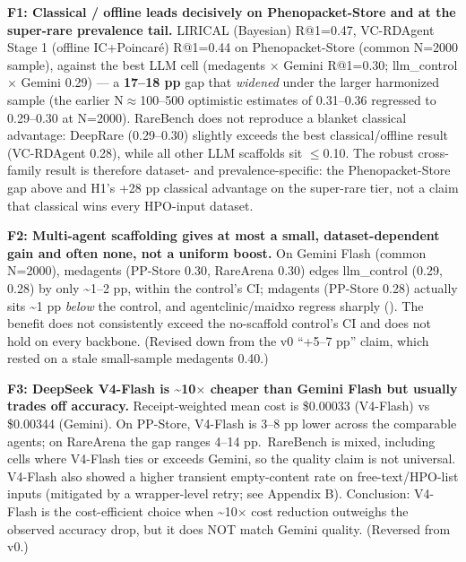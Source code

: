 \textbf{F1: Classical / offline leads decisively on Phenopacket-Store and at the super-rare prevalence tail.}
LIRICAL (Bayesian) R@1=0.47, VC-RDAgent Stage 1 (offline IC+Poincar\'e)
R@1=0.44 on Phenopacket-Store (common N=2000 sample), against the best LLM
cell (medagents \ensuremath{\times} Gemini R@1=0.30; llm\_control \ensuremath{\times} Gemini 0.29) --- a
\textbf{17--18 pp} gap that \emph{widened} under the larger harmonized sample (the earlier
N\ensuremath{\approx}100--500 optimistic estimates of 0.31--0.36 regressed to 0.29--0.30 at N=2000).
RareBench does not reproduce a blanket classical advantage: DeepRare
(0.29--0.30) slightly exceeds the best classical/offline result
(VC-RDAgent 0.28), while all other LLM scaffolds sit \ensuremath{\leq}0.10. The robust
cross-family result is therefore dataset- and prevalence-specific: the
Phenopacket-Store gap above and H1's +28 pp classical advantage on the
super-rare tier, not a claim that classical wins every HPO-input dataset.

\textbf{F2: Multi-agent scaffolding gives at most a small, dataset-dependent gain and often none, not a uniform boost.} On Gemini Flash (common N=2000), medagents
(PP-Store 0.30, RareArena 0.30) edges llm\_control (0.29, 0.28) by only \textasciitilde1--2 pp,
within the control's CI; mdagents (PP-Store 0.28) actually sits \textasciitilde1 pp \emph{below} the
control, and agentclinic/maidxo regress sharply (). The benefit does not
consistently exceed the no-scaffold control's CI and does not hold on every
backbone. (Revised down from the v0 ``+5--7 pp'' claim, which rested on a stale small-sample medagents 0.40.)

\textbf{F3: DeepSeek V4-Flash is \textasciitilde10\ensuremath{\times} cheaper than Gemini Flash but usually trades off accuracy.} Receipt-weighted mean cost is \$0.00033 (V4-Flash) vs
\$0.00344 (Gemini). On PP-Store, V4-Flash is 3--8 pp lower across the
comparable agents; on RareArena the gap ranges 4--14 pp.~RareBench is mixed,
including cells where V4-Flash ties or exceeds Gemini, so the quality claim is
not universal. V4-Flash also showed a higher
transient empty-content rate on free-text/HPO-list inputs (mitigated by a
wrapper-level retry; see Appendix B). Conclusion: V4-Flash is the cost-efficient choice when \textasciitilde10\ensuremath{\times} cost reduction outweighs the observed accuracy drop, but it does NOT match Gemini quality. (Reversed from v0.)

